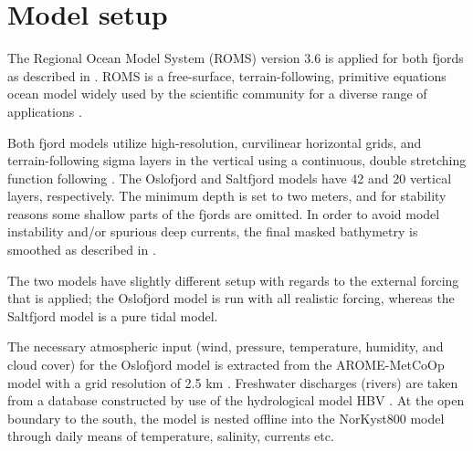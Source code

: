 \section{Model setup}

The Regional Ocean Model System (ROMS) version 3.6 is applied for both fjords as described in \cite{roed16}. ROMS is a free-surface, terrain-following, primitive equations ocean model widely used by the scientific community for a diverse range of applications \cite[]{shchepetkin05,shchepetkin09,haidvogel08}. 

Both fjord models utilize high-resolution, curvilinear horizontal grids, and terrain-following sigma layers in the vertical using a continuous, double stretching function following \cite{shchepetkin09}. The Oslofjord and Saltfjord models have 42 and 20 vertical layers, respectively. The minimum depth is set to two meters, and for stability reasons some shallow parts of the fjords are omitted. In order to avoid model instability and/or spurious deep currents, the final masked bathymetry is smoothed as described in \cite{roed16}.



The two models have slightly different setup with regards to the external forcing that is applied; the Oslofjord model is run with all realistic forcing, whereas the Saltfjord model is a pure tidal model. 

The necessary atmospheric input (wind, pressure, temperature, humidity, and cloud cover) for the Oslofjord model is extracted from the AROME-MetCoOp model with a grid resolution of 2.5 km \cite[]{muller2015}. Freshwater discharges (rivers) are taken from a database constructed by use of the hydrological model HBV \cite[]{beldring2003}. At the open boundary to the south, the model is nested offline into the NorKyst800 model \cite[]{albretsen11} through daily means of temperature, salinity, currents etc.

